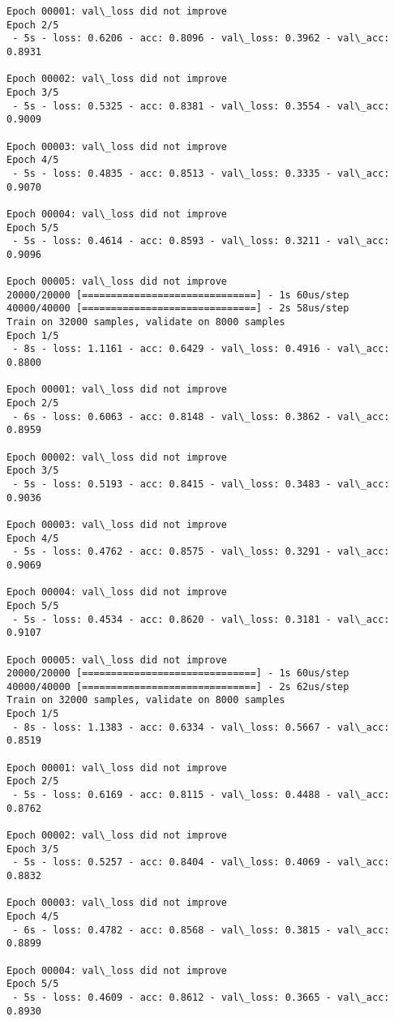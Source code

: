 \documentclass[11pt]{article}
\begin{document}
\begin{Verbatim}[commandchars=\\\{\}]
Epoch 00001: val\_loss did not improve
Epoch 2/5
 - 5s - loss: 0.6206 - acc: 0.8096 - val\_loss: 0.3962 - val\_acc: 0.8931

Epoch 00002: val\_loss did not improve
Epoch 3/5
 - 5s - loss: 0.5325 - acc: 0.8381 - val\_loss: 0.3554 - val\_acc: 0.9009

Epoch 00003: val\_loss did not improve
Epoch 4/5
 - 5s - loss: 0.4835 - acc: 0.8513 - val\_loss: 0.3335 - val\_acc: 0.9070

Epoch 00004: val\_loss did not improve
Epoch 5/5
 - 5s - loss: 0.4614 - acc: 0.8593 - val\_loss: 0.3211 - val\_acc: 0.9096

Epoch 00005: val\_loss did not improve
20000/20000 [==============================] - 1s 60us/step
40000/40000 [==============================] - 2s 58us/step
Train on 32000 samples, validate on 8000 samples
Epoch 1/5
 - 8s - loss: 1.1161 - acc: 0.6429 - val\_loss: 0.4916 - val\_acc: 0.8800

Epoch 00001: val\_loss did not improve
Epoch 2/5
 - 6s - loss: 0.6063 - acc: 0.8148 - val\_loss: 0.3862 - val\_acc: 0.8959

Epoch 00002: val\_loss did not improve
Epoch 3/5
 - 5s - loss: 0.5193 - acc: 0.8415 - val\_loss: 0.3483 - val\_acc: 0.9036

Epoch 00003: val\_loss did not improve
Epoch 4/5
 - 5s - loss: 0.4762 - acc: 0.8575 - val\_loss: 0.3291 - val\_acc: 0.9069

Epoch 00004: val\_loss did not improve
Epoch 5/5
 - 5s - loss: 0.4534 - acc: 0.8620 - val\_loss: 0.3181 - val\_acc: 0.9107

Epoch 00005: val\_loss did not improve
20000/20000 [==============================] - 1s 60us/step
40000/40000 [==============================] - 2s 62us/step
Train on 32000 samples, validate on 8000 samples
Epoch 1/5
 - 8s - loss: 1.1383 - acc: 0.6334 - val\_loss: 0.5667 - val\_acc: 0.8519

Epoch 00001: val\_loss did not improve
Epoch 2/5
 - 5s - loss: 0.6169 - acc: 0.8115 - val\_loss: 0.4488 - val\_acc: 0.8762

Epoch 00002: val\_loss did not improve
Epoch 3/5
 - 5s - loss: 0.5257 - acc: 0.8404 - val\_loss: 0.4069 - val\_acc: 0.8832

Epoch 00003: val\_loss did not improve
Epoch 4/5
 - 6s - loss: 0.4782 - acc: 0.8568 - val\_loss: 0.3815 - val\_acc: 0.8899

Epoch 00004: val\_loss did not improve
Epoch 5/5
 - 5s - loss: 0.4609 - acc: 0.8612 - val\_loss: 0.3665 - val\_acc: 0.8930


\end{Verbatim}
\end{document}
